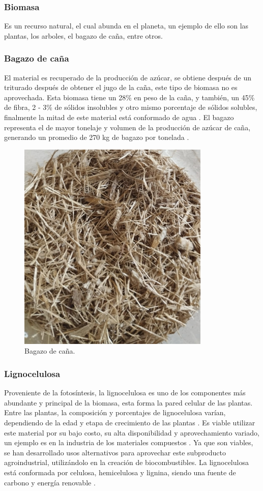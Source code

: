 \documentclass[12pt]{article}
\begin{document}
		\subsubsection{Biomasa}
	Es un recurso natural, el cual abunda en el planeta, un ejemplo de ello son las plantas, los arboles, el bagazo de caña, entre otros.
		
		\subsubsection{Bagazo de caña}
		El material es recuperado de la producción de azúcar, se obtiene después de un triturado después de obtener el jugo de la caña, este tipo de biomasa no es aprovechada. Esta biomasa tiene un 28\% en peso de la caña, y también, un 45\% de fibra, 2 - 3\% de sólidos insolubles y otro mismo porcentaje de sólidos solubles, finalmente la mitad de este material está conformado de agua \cite{olmo2015bagazo}.
		El bagazo representa el de mayor tonelaje y volumen de la producción de azúcar de caña, generando un promedio de 270 kg de bagazo por tonelada \cite{perez2022efecto}.
		
		\begin{figure}[h]
			\centering
			\includegraphics[width=0.4\linewidth]{imagenes/bagazo}
			\caption[Bagazo de caña.]{Bagazo de caña.}
			\label{fig:bagazo}
		\end{figure}
		
		\subsubsection{Lignocelulosa}
		
		Proveniente de la fotosíntesis, la lignocelulosa es uno de los componentes más abundante y principal de la biomasa, esta forma la pared celular de las plantas. Entre las plantas, la composición y porcentajes de lignocelulosa varían, dependiendo de la edad y etapa de crecimiento de las plantas \cite{cuervo2009lignocelulosa}.
		Es viable utilizar este material por su bajo costo, su alta disponibilidad y aprovechamiento variado, un ejemplo es en la industria de los materiales compuestos \cite{jara2022principales}.
		Ya que son viables, se han desarrollado usos alternativos para aprovechar este subproducto agroindustrial, utilizándolo en la creación de biocombustibles.
		La lignocelulosa está conformada por celulosa, hemicelulosa y lignina, siendo una fuente de carbono y energía renovable \cite{portalproduccion}. 
		
\end{document}
